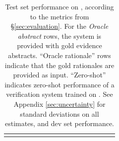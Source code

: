 \begin{table}[t]
\begin{tabularx}{\linewidth}{*{3}{l} *{6}{c} *{1}{c} *{6}{c}}
\arrayrulecolor{black}\bottomrule

  \end{tabularx}

  \caption{Test set performance on \ours, according to the metrics from \S\ref{sec:evaluation}. For the \emph{Oracle abstract} rows, the system is provided with gold evidence abstracts. ``Oracle rationale'' rows indicate that the gold rationales are provided as input. ``Zero-shot'' indicates zero-shot performance of a verification system trained on \fever. See Appendix \ref{sec:uncertainty} for standard deviations on all estimates, and dev set performance. }
    \label{tbl:main_results}

\end{table}
